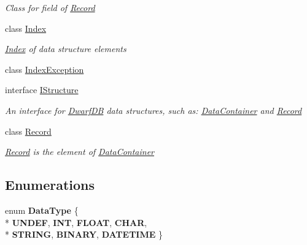 \begin{DoxyCompactItemize}
\begin{DoxyCompactList}\small\item\em Class for field of \hyperlink{class_dwarf_d_b_1_1_data_structures_1_1_record}{Record} \end{DoxyCompactList}\item 
class \hyperlink{class_dwarf_d_b_1_1_data_structures_1_1_index}{Index}
\begin{DoxyCompactList}\small\item\em \hyperlink{class_dwarf_d_b_1_1_data_structures_1_1_index}{Index} of data structure elements \end{DoxyCompactList}\item 
class \hyperlink{class_dwarf_d_b_1_1_data_structures_1_1_index_exception}{Index\+Exception}
\item 
interface \hyperlink{interface_dwarf_d_b_1_1_data_structures_1_1_i_structure}{I\+Structure}
\begin{DoxyCompactList}\small\item\em An interface for \hyperlink{namespace_dwarf_d_b}{Dwarf\+D\+B} data structures, such as\+: \hyperlink{class_dwarf_d_b_1_1_data_structures_1_1_data_container}{Data\+Container} and \hyperlink{class_dwarf_d_b_1_1_data_structures_1_1_record}{Record} \end{DoxyCompactList}\item 
class \hyperlink{class_dwarf_d_b_1_1_data_structures_1_1_record}{Record}
\begin{DoxyCompactList}\small\item\em \hyperlink{class_dwarf_d_b_1_1_data_structures_1_1_record}{Record} is the element of \hyperlink{class_dwarf_d_b_1_1_data_structures_1_1_data_container}{Data\+Container} \end{DoxyCompactList}\end{DoxyCompactItemize}
\subsection*{Enumerations}
\begin{DoxyCompactItemize}
\item 
\hypertarget{namespace_dwarf_d_b_1_1_data_structures_addb5abc91c4c09e6f8d87456bb41ef82}{enum {\bfseries Data\+Type} \{ \\*
{\bfseries U\+N\+D\+E\+F}, 
{\bfseries I\+N\+T}, 
{\bfseries F\+L\+O\+A\+T}, 
{\bfseries C\+H\+A\+R}, 
\\*
{\bfseries S\+T\+R\+I\+N\+G}, 
{\bfseries B\+I\+N\+A\+R\+Y}, 
{\bfseries D\+A\+T\+E\+T\+I\+M\+E}
 \}}\label{namespace_dwarf_d_b_1_1_data_structures_addb5abc91c4c09e6f8d87456bb41ef82}

\end{DoxyCompactItemize}
